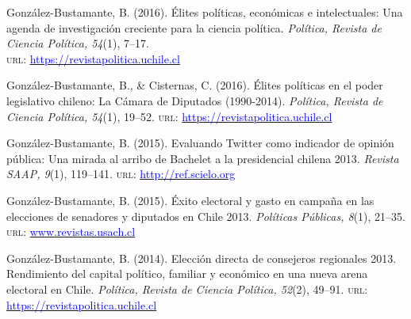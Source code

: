 \begin{publications}

\begin{benumerate}{9}
\item{\small Gonz\'alez-Bustamante, B. (2016). Élites políticas, económicas e intelectuales: Una agenda de investigación creciente para la ciencia política. {\itshape Pol\'itica, Revista de Ciencia Pol\'itica, 54}(1), 7--17. \\ {\scshape url}: \href{https://revistapolitica.uchile.cl/index.php/RP/article/view/42690}{\textcolor{blue}{https://revistapolitica.uchile.cl}}}\vspace{1mm}

\item{\small Gonz\'alez-Bustamante, B., \& Cisternas, C. (2016). Élites políticas en el poder legislativo chileno: La Cámara de Diputados (1990-2014). {\itshape Pol\'itica, Revista de Ciencia Pol\'itica, 54}(1), 19--52. {\scshape url}: \href{https://revistapolitica.uchile.cl/index.php/RP/article/view/42691}{\textcolor{blue}{https://revistapolitica.uchile.cl}}}\vspace{1mm}

\item{\small Gonz\'alez-Bustamante, B. (2015). Evaluando Twitter como indicador de opinión pública: Una mirada al arribo de Bachelet a la presidencial chilena 2013. {\itshape Revista SAAP, 9}(1), 119--141. {\scshape url}: \href{http://ref.scielo.org/dwzhns}{\textcolor{blue}{http://ref.scielo.org}}} \vspace{1mm}

\item{\small Gonz\'alez-Bustamante, B. (2015). Éxito electoral y gasto en campaña en las elecciones de senadores y diputados en Chile 2013. {\itshape Pol\'iticas P\'ublicas, 8}(1), 21--35. {\scshape url}: \href{http://www.revistas.usach.cl/ojs/index.php/politicas/article/view/2182}{\textcolor{blue}{www.revistas.usach.cl}}} \vspace{1mm}

\item{\small Gonz\'alez-Bustamante, B. (2014). Elección directa de consejeros regionales 2013. Rendimiento del capital político, familiar y económico en una nueva arena electoral en Chile. {\itshape Pol\'itica, Revista de Ciencia Pol\'itica, 52}(2), 49--91. {\scshape url}: \href{https://revistapolitica.uchile.cl/index.php/RP/article/view/36137}{\textcolor{blue}{https://revistapolitica.uchile.cl}}} \vspace{1mm}


\end{benumerate}
\end{publications}
